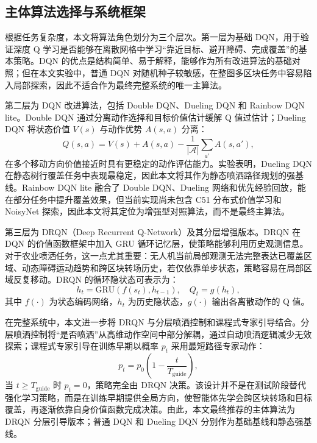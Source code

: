 \documentclass[UTF8]{ctexart}
\begin{document}
\subsection{主体算法选择与系统框架}

根据任务复杂度，本文将算法角色划分为三个层次。第一层为基础 DQN，用于验证深度 Q 学习是否能够在离散网格中学习“靠近目标、避开障碍、完成覆盖”的基本策略。DQN 的优点是结构简单、易于解释，能够作为所有改进算法的基础对照；但在本文实验中，普通 DQN 对随机种子较敏感，在整图多区块任务中容易陷入局部探索，因此不适合作为最终完整系统的唯一主算法。

第二层为 DQN 改进算法，包括 Double DQN、Dueling DQN 和 Rainbow DQN lite。Double DQN 通过分离动作选择和目标价值估计缓解 Q 值过估计；Dueling DQN 将状态价值 $V(s)$ 与动作优势 $A(s,a)$ 分离：
\begin{equation}
Q(s,a)=V(s)+A(s,a)-\frac{1}{|\mathcal{A}|}\sum_{a'}A(s,a'),
\end{equation}
在多个移动方向价值接近时具有更稳定的动作评估能力。实验表明，Dueling DQN 在静态树行覆盖任务中表现最稳定，因此本文将其作为静态喷洒路径规划的强基线。Rainbow DQN lite 融合了 Double DQN、Dueling 网络和优先经验回放，能在部分任务中提升覆盖效果，但当前实现尚未包含 C51 分布式价值学习和 NoisyNet 探索，因此本文将其定位为增强型对照算法，而不是最终主算法。

第三层为 DRQN（Deep Recurrent Q-Network）及其分层增强版本。DRQN 在 DQN 的价值函数框架中加入 GRU 循环记忆层，使策略能够利用历史观测信息。对于农业喷洒任务，这一点尤其重要：无人机当前局部观测无法完整表达已覆盖区域、动态障碍运动趋势和跨区块转场历史，若仅依靠单步状态，策略容易在局部区域反复移动。DRQN 的循环隐状态可表示为：
\begin{equation}
h_t = \mathrm{GRU}(f(s_t), h_{t-1}), \quad Q_t = g(h_t),
\end{equation}
其中 $f(\cdot)$ 为状态编码网络，$h_t$ 为历史隐状态，$g(\cdot)$ 输出各离散动作的 Q 值。

在完整系统中，本文进一步将 DRQN 与分层喷洒控制和课程式专家引导结合。分层喷洒控制将“是否喷洒”从高维动作空间中部分解耦，通过自动喷洒逻辑减少无效探索；课程式专家引导在训练早期以概率 $p_t$ 采用最短路径专家动作：
\begin{equation}
p_t = p_0 \left(1 - \frac{t}{T_{\mathrm{guide}}}\right),
\end{equation}
当 $t \geq T_{\mathrm{guide}}$ 时 $p_t=0$，策略完全由 DRQN 决策。该设计并不是在测试阶段替代强化学习策略，而是在训练早期提供全局方向，使智能体先学会跨区块转场和目标覆盖，再逐渐依靠自身价值函数完成决策。由此，本文最终推荐的主体算法为 DRQN 分层引导版本；普通 DQN 和 Dueling DQN 分别作为基础基线和静态强基线。
\end{document}
